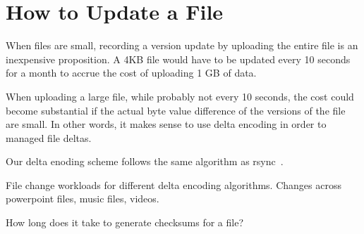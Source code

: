 \section{How to Update a File}

When files are small, recording a version update by uploading the
entire file is an inexpensive proposition. A 4KB file would have to be
updated every 10 seconds for a month to accrue the cost of uploading 1
GB of data.

When uploading a large file, while probably not every 10 seconds, the
cost could become substantial if the actual byte value difference of
the versions of the file are small. In other words, it makes sense to
use delta encoding in order to managed file deltas.

Our delta enoding scheme follows the same algorithm as
rsync~\cite{rsync}. 

File change workloads for different delta encoding algorithms. Changes
across powerpoint files, music files, videos.

How long does it take to generate checksums for a file? 


